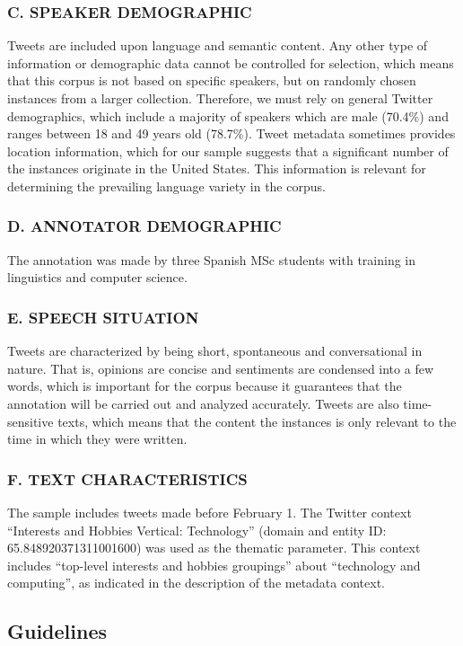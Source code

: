 \documentclass[11pt,a4paper]{article}
\begin{document}
\subsubsection*{C. SPEAKER DEMOGRAPHIC}
Tweets are included upon language and semantic content. Any other type of information or demographic data cannot be controlled for selection, which means that this corpus is not based on specific speakers, but on randomly chosen instances from a larger collection.
Therefore, we must rely on general Twitter demographics, which include a majority of speakers which are male (70.4\%) and ranges between 18 and 49 years old (78.7\%). Tweet metadata sometimes provides location information, which for our sample suggests that a significant number of the instances originate in the United States. This information is relevant for determining the prevailing language variety in the corpus.

\subsubsection*{D. ANNOTATOR DEMOGRAPHIC}
The annotation was made by three Spanish MSc students with training in linguistics and computer science.

\subsubsection*{E. SPEECH SITUATION}
Tweets are characterized by being short, spontaneous and conversational in nature. That is, opinions are concise and sentiments are condensed into a few words, which is important for the corpus because it guarantees that the annotation will be carried out and analyzed accurately. Tweets are also time-sensitive texts, which means that the content the instances is only relevant to the time in which they were written.

\subsubsection*{F. TEXT CHARACTERISTICS}
The sample includes tweets made before February 1. The Twitter context “Interests and Hobbies Vertical: Technology'' (domain and entity ID: 65.848920371311001600) was used as the thematic parameter. This context includes “top-level interests and hobbies groupings” about “technology and computing”, as indicated in the description of the metadata context.

\subsection{Guidelines}
\end{document}
